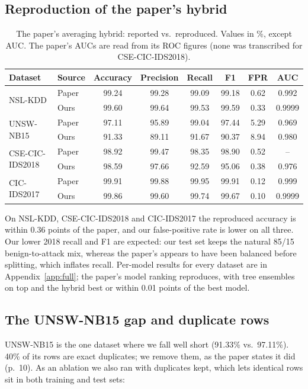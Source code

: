 \documentclass[11pt,a4paper]{article}
\begin{document}
\subsection{Reproduction of the paper's hybrid}
\begin{table}[H]
\centering
\caption{The paper's averaging hybrid: reported vs.\ reproduced. Values in \%, except AUC. The paper's AUCs are
read from its ROC figures (none was transcribed for CSE-CIC-IDS2018).}
\label{tab:repro}
\small
\begin{tabular}{llcccccc}
\toprule
Dataset & Source & Accuracy & Precision & Recall & F1 & FPR & AUC \\
\midrule
\multirow{2}{*}{NSL-KDD}         & Paper & 99.24 & 99.28 & 99.09 & 99.18 & 0.62 & 0.992 \\
                                 & Ours  & 99.60 & 99.64 & 99.53 & 99.59 & 0.33 & 0.9999 \\
\midrule
\multirow{2}{*}{UNSW-NB15}       & Paper & 97.11 & 95.89 & 99.04 & 97.44 & 5.29 & 0.969 \\
                                 & Ours  & 91.33 & 89.11 & 91.67 & 90.37 & 8.94 & 0.980 \\
\midrule
\multirow{2}{*}{CSE-CIC-IDS2018} & Paper & 98.92 & 99.47 & 98.35 & 98.90 & 0.52 & -- \\
                                 & Ours  & 98.59 & 97.66 & 92.59 & 95.06 & 0.38 & 0.976 \\
\midrule
\multirow{2}{*}{CIC-IDS2017}     & Paper & 99.91 & 99.88 & 99.95 & 99.91 & 0.12 & 0.999 \\
                                 & Ours  & 99.86 & 99.60 & 99.74 & 99.67 & 0.10 & 0.9999 \\
\bottomrule
\end{tabular}
\end{table}

On NSL-KDD, CSE-CIC-IDS2018 and CIC-IDS2017 the reproduced accuracy is within 0.36 points of the paper, and our
false-positive rate is lower on all three. Our lower 2018 recall and F1 are expected: our test set keeps the natural
85/15 benign-to-attack mix, whereas the paper's appears to have been balanced before splitting, which inflates
recall. Per-model results for every dataset are in Appendix~\ref{app:full}; the paper's model ranking reproduces,
with tree ensembles on top and the hybrid best or within 0.01 points of the best model.

\subsection{The UNSW-NB15 gap and duplicate rows}
\label{sec:unsw}
UNSW-NB15 is the one dataset where we fall well short (91.33\% vs.\ 97.11\%). 40\% of its rows are exact duplicates;
we remove them, as the paper states it did (p.~10). As an ablation we also ran with duplicates kept, which lets
identical rows sit in both training and test sets:
\end{document}
